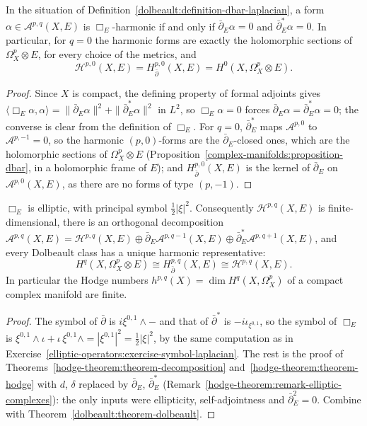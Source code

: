 \begin{lemma}\label{dolbeault:lemma-harmonic-closed}
In the situation of Definition~\ref{dolbeault:definition-dbar-laplacian}, a form $\alpha \in \mathcal{A}^{p,q}(X, E)$ is $\Box_E$-harmonic if and only if $\bar\partial_E\alpha = 0$ and $\bar\partial_E^*\alpha = 0$. In
particular, for $q = 0$ the harmonic forms are exactly the holomorphic sections of $\Omega^p_X \otimes E$, for every choice of the metrics, and
\[
\mathcal{H}^{p,0}(X, E) = H^{p,0}_{\bar\partial}(X, E) = H^0(X, \Omega^p_X \otimes E).
\]
\end{lemma}

\begin{proof}
Since $X$ is compact, the defining property of formal adjoints gives $\langle\Box_E\alpha, \alpha\rangle = \|\bar\partial_E\alpha\|^2 + \|\bar\partial_E^*\alpha\|^2$ in $L^2$, so $\Box_E\alpha = 0$ forces
$\bar\partial_E\alpha = \bar\partial_E^*\alpha = 0$; the converse is clear from the definition of $\Box_E$. For $q = 0$, $\bar\partial_E^*$ maps $\mathcal{A}^{p,0}$ to $\mathcal{A}^{p,-1} = 0$, so the harmonic
$(p,0)$-forms are the $\bar\partial_E$-closed ones, which are the holomorphic sections of $\Omega^p_X \otimes E$ (Proposition~\ref{complex-manifolds:proposition-dbar}, in a holomorphic frame of $E$); and
$H^{p,0}_{\bar\partial}(X, E)$ is the kernel of $\bar\partial_E$ on $\mathcal{A}^{p,0}(X, E)$, as there are no forms of type $(p,-1)$.
\end{proof}

\begin{theorem}\label{dolbeault:theorem-dbar-hodge}
$\Box_E$ is elliptic, with principal symbol $\frac12|\xi|^2$. Consequently $\mathcal{H}^{p,q}(X, E)$ is finite-dimensional, there is an orthogonal decomposition
$\mathcal{A}^{p,q}(X, E) = \mathcal{H}^{p,q}(X, E) \oplus \bar\partial_E\mathcal{A}^{p,q-1}(X, E) \oplus \bar\partial_E^*\mathcal{A}^{p,q+1}(X, E)$, and every Dolbeault class has a unique harmonic
representative:
\[
H^q(X, \Omega^p_X \otimes E) \cong H^{p,q}_{\bar\partial}(X, E) \cong \mathcal{H}^{p,q}(X, E).
\]
In particular the Hodge numbers $h^{p,q}(X) = \dim H^q(X, \Omega^p_X)$ of a compact complex manifold are finite.
\end{theorem}

\begin{proof}
The symbol of $\bar\partial$ is $i\xi^{0,1} \wedge -$ and that of $\bar\partial^*$ is $-i\iota_{\xi^{0,1}}$, so the symbol of $\Box_E$ is $\xi^{0,1} \wedge \iota + \iota\,\xi^{0,1} \wedge = |\xi^{0,1}|^2 = \frac12|\xi|^2$, by the
same computation as in Exercise~\ref{elliptic-operators:exercise-symbol-laplacian}. The rest is the proof of Theorems~\ref{hodge-theorem:theorem-decomposition}
and~\ref{hodge-theorem:theorem-hodge} with $d$, $\delta$ replaced by $\bar\partial_E$, $\bar\partial_E^*$ (Remark~\ref{hodge-theorem:remark-elliptic-complexes}): the only inputs were ellipticity, self-adjointness and
$\bar\partial_E^2 = 0$. Combine with Theorem~\ref{dolbeault:theorem-dolbeault}.
\end{proof}

